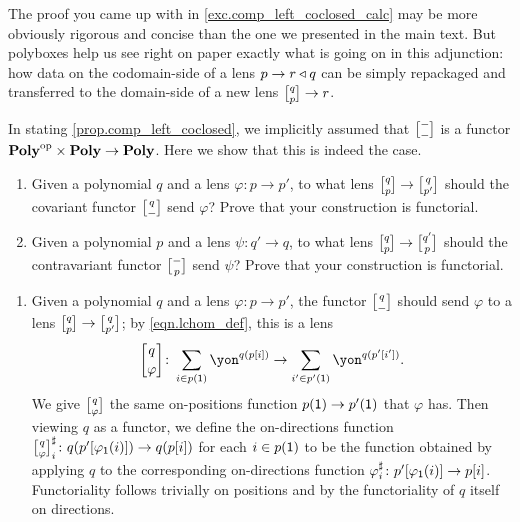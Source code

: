 \documentclass[Book-Poly]{subfiles}
\begin{document}
\begin{remark}
The proof you came up with in \cref{exc.comp_left_coclosed_calc} may be more obviously rigorous and concise than the one we presented in the main text.
But polyboxes help us see right on paper exactly what is going on in this adjunction: how data on the codomain-side of a lens $p\to r\mathbin{\triangleleft} q$ can be simply repackaged and transferred to the domain-side of a new lens $\lchom{q}{p}\to r$.
\end{remark}

\begin{exercise} \label{exc.lchom_func}
In stating \cref{prop.comp_left_coclosed}, we implicitly assumed that $\lchom{-}{-}$ is a functor $\mathbf{Poly}^{\textnormal{op}}\times\mathbf{Poly}\to\mathbf{Poly}$.
Here we show that this is indeed the case.
\begin{enumerate}
    \item Given a polynomial $q$ and a lens $\varphi\colon p\to p'$, to what lens $\lchom{q}{p}\to\lchom{q}{p'}$ should the covariant functor $\lchom{q}{-}$ send $\varphi$?
    Prove that your construction is functorial.
    
    \item Given a polynomial $p$ and a lens $\psi\colon q'\to q$, to what lens $\lchom{q}{p}\to\lchom{q'}{p}$ should the contravariant functor $\lchom{-}{p}$ send $\psi$?
    Prove that your construction is functorial.
    \qedhere
\end{enumerate}
\begin{solution}
\begin{enumerate}
    \item Given a polynomial $q$ and a lens $\varphi\colon p\to p'$, the functor $\lchom{q}{-}$ should send $\varphi$ to a lens $\lchom{q}{p}\to\lchom{q}{p'}$; by \eqref{eqn.lchom_def}, this is a lens
    \[
        \lchom{q}{\varphi}\colon\sum_{i\in p(\1)}\yon^{q(p[i])}\to\sum_{i'\in p'(\1)}\yon^{q(p'[i'])}.
    \]
    We give $\lchom{q}{\varphi}$ the same on-positions function $p(\textsf{1})\to p'(\textsf{1})$ that $\varphi$ has.
    Then viewing $q$ as a functor, we define the on-directions function $\lchom{q}{\varphi}^\sharp_i\colon q(p'[\varphi_\1(i)])\to q(p[i])$ for each $i\in p(\textsf{1})$ to be the function obtained by applying $q$ to the corresponding on-directions function $\varphi^\sharp_i\colon p'[\varphi_{\textsf{1}}(i)]\to p[i]$.
    Functoriality follows trivially on positions and by the functoriality of $q$ itself on directions.


\end{enumerate}
\end{solution}
\end{exercise}
\end{document}
